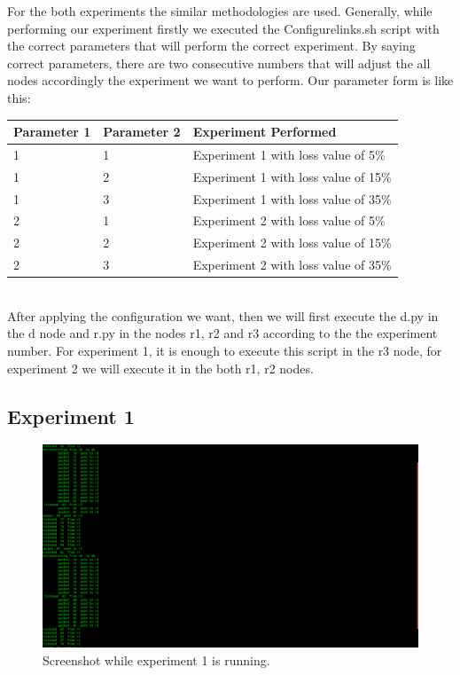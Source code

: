 \documentclass[conference]{IEEEtran}
\begin{document}
For the both experiments the similar methodologies are used. Generally, while performing our experiment firstly we executed the Configurelinks.sh script with the correct parameters that will perform the correct experiment. By saying correct parameters, there are two consecutive numbers that will adjust the all nodes accordingly the experiment we want to perform. Our parameter form is like this: \\
\begin{table}[ht]
\begin{tabular}{|l|l|l|}
\hline
Parameter 1 & Parameter 2 & Experiment Performed                          \\ \hline
1           & 1           & Experiment 1 with loss value of 5\%  \\ \hline
1           & 2           & Experiment 1 with loss value of 15\% \\ \hline
1           & 3           & Experiment 1 with loss value of 35\% \\ \hline
2           & 1           & Experiment 2 with loss value of 5\%  \\ \hline
2           & 2           & Experiment 2 with loss value of 15\% \\ \hline
2           & 3           & Experiment 2 with loss value of 35\% \\ \hline
\end{tabular}
\end{table} \\ 

After applying the configuration we want, then we will first execute the d.py in the d node and r.py in the nodes r1, r2 and r3 according to the the experiment number. For experiment 1, it is enough to execute this script in the r3 node, for experiment 2 we will execute it in the both r1, r2 nodes.

\subsection{Experiment 1}

\begin{figure}[h]
  \includegraphics[width=\linewidth]{experiment1.png}
  \caption{Screenshot while experiment 1 is running.}
  \label{fig:ss1}
\end{figure}
\end{document}
